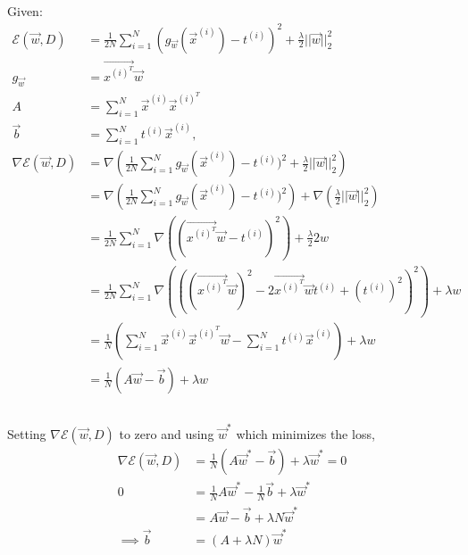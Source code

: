\documentclass{article}
\begin{document}
{\subsection{}
Given:
\begin{align*}
\mathcal{E}(\vec{w}, D) &= \frac{1}{2N} \sum_{i=1}^N (g_{\vec{w}} (\vec{x}^{(i)}) - t^{(i)} )^2 + \frac{\lambda}{2} || \vec{w} || _2^2 \\
g_{\vec{w}} &= \vec{x^{(i)^T}} \vec{w} \\
A &= \sum_{i=1}^N \vec{x}^{(i)}   \vec{x}^{(i)^T} \\
\vec{b} &= \sum_{i=1}^N t^{(i)} \vec{x}^{(i)} \text{,} \\
\nabla \mathcal{E}(\vec{w}, D) &= \nabla \left( \frac{1}{2N} \sum_{i=1}^N g_{\vec{w}} (\vec{x}^{(i)}) - t^{(i)} )^2 + \frac{\lambda}{2} || \vec{w} || _2^2 \right) \\
&= \nabla \left( \frac{1}{2N} \sum_{i=1}^N g_{\vec{w}} (\vec{x}^{(i)}) - t^{(i)} )^2 \right) + \nabla \left( \frac{\lambda}{2} || \vec{w} || _2^2 \right) \\
&=  \frac{1}{2N} \sum_{i=1}^N \nabla \left( (\vec{x^{(i)^T}} \vec{w} - t^{(i)} )^2 \right) + \frac{\lambda}{2} 2w \\
&=  \frac{1}{2N} \sum_{i=1}^N \nabla \left( ((\vec{x^{(i)^T}} \vec{w})^2 - 2 \vec{x^{(i)^T}} \vec{w} t^{(i)} + (t^{(i)})^2 )^2 \right) + \lambda w \\
&= \frac{1}{N} ( \sum_{i=1}^N \vec{x}^{(i)}   \vec{x}^{(i)^T} \vec{w} - \sum_{i=1}^N t^{(i)} \vec{x}^{(i)} ) + \lambda w \\
&= \frac{1}{N} (A \vec{w} - \vec{b}) + \lambda w
\end{align*}













\subsection{}
Setting $\nabla \mathcal{E} (\vec{w}, D)$ to zero and using $\vec{w}^*$ which minimizes the loss,
\begin{align*}
\nabla \mathcal{E} (\vec{w}, D) &=  \frac{1}{N} (A \vec{w}^* - \vec{b}) + \lambda \vec{w}^* = 0 \\
0 &= \frac{1}{N} A \vec{w}^* - \frac{1}{N} \vec{b} + \lambda \vec{w}^* \\
&= A \vec{w} - \vec{b} + \lambda N \vec{w}^* \\
\implies \vec{b} &= (A + \lambda N) \vec{w}^*
\end{align*}








}
\end{document}
